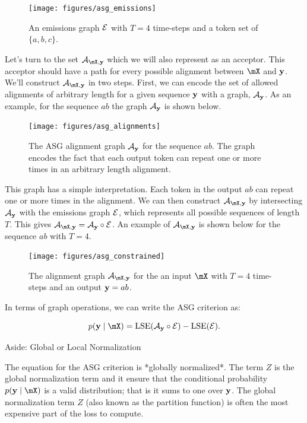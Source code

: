 \begin{figure}
    \centering
    \texttt{[image: figures/asg\_emissions]}
    \caption{An emissions graph $\mathcal{E}$ with $T=4$ time-steps and a token set of
    $\{a, b, c\}$.}
    \label{fig:asg_emissions}
\end{figure}

Let's turn to the set $\gA_{\mX, \vy}$ which we will also represent as an
acceptor. This acceptor should have a path for every possible alignment between
$\mX$ and ${\bf y}$. We'll construct $\gA_{\mX, \vy}$ in two steps. First, we can
encode the set of allowed alignments of arbitrary length for a given sequence
${\bf y}$ with a graph, $\mathcal{A}_{\bf y}$. As an example, for the sequence $ab$ the graph
$\mathcal{A}_{\bf y}$ is shown below.

\begin{figure}
    \centering
    \texttt{[image: figures/asg\_alignments]}
    \caption{The ASG alignment graph $\mathcal{A}_{\bf y}$ for the sequence $ab$. The graph
    encodes the fact that each output token can repeat one or more times in an
    arbitrary length alignment.}
    \label{fig:asg_alignments}
\end{figure}

This graph has a simple interpretation. Each token in the output $ab$ can
repeat one or more times in the alignment. We can then construct
$\gA_{\mX,\vy}$ by intersecting $\mathcal{A}_{\bf y}$ with the emissions graph $\mathcal{E}$, which
represents all possible sequences of length $T$. This gives $\gA_{\mX,\vy} =
\gA_\vy \circ \gE$. An example of $\gA_{\mX, \vy}$ is shown below for the
sequence $ab$ with $T=4$.

\begin{figure}
    \centering
    \texttt{[image: figures/asg\_constrained]}
    \caption{The alignment graph $\gA_{\mX, \vy}$ for the an input $\mX$ with
    $T=4$ time-steps and an output ${\bf y} = ab$.}
    \label{fig:asg_constrained}
\end{figure}

In terms of graph operations, we can write the ASG criterion as:

$$
p(\vy \mid \mX) = \LSE(\gA_\vy \circ \gE) - \LSE(\gE).
$$

Aside: Global or Local Normalization

The equation for the ASG criterion is *globally normalized*. The term $Z$ is
the global normalization term and it ensure that the conditional probability
$p(\vy \mid \mX)$ is a valid distribution; that is it sums to one over ${\bf y}$.
The global normalization term $Z$ (also known as the partition function) is
often the most expensive part of the loss to compute.

